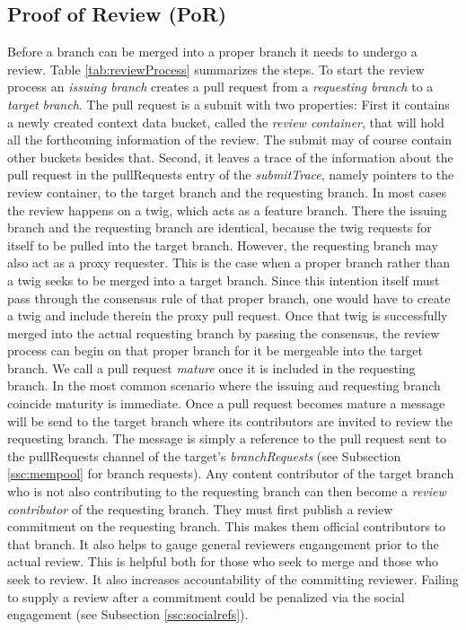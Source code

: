 \documentclass[14pt]{article}
\begin{document}
\subsection{Proof of Review (PoR)}
\label{ssc:por}

Before a branch can be merged into a proper branch it needs to undergo a review. Table \ref{tab:reviewProcess} summarizes the steps.
To start the review process an \textit{issuing branch} creates a pull request from a \textit{requesting branch} to a \textit{target branch}. The pull request is a submit with two properties: First it contains a newly created context data bucket, called the \textit{review container}, that will hold all the forthcoming information of the review. The submit may of course contain other buckets besides that. Second, it leaves a trace of the information about the pull request in the pullRequests entry of the \textit{submitTrace}, namely pointers to the review container, to the target branch and the requesting branch. In most cases the review happens on a twig, which acts as a feature branch. There the issuing branch and the requesting branch are identical, because the twig requests for itself to be pulled into the target branch. However, the requesting branch may also act as a proxy requester. This is the case when a proper branch rather than a twig seeks to be merged into a target branch. Since this intention itself must pass through the consensus rule of that proper branch, one would have to create a twig and include therein the proxy pull request. Once that twig is successfully merged into the actual requesting branch by passing the consensus, the review process can begin on that proper branch for it be mergeable into the target branch. We call a pull request \textit{mature} once it is included in the requesting branch. In the most common scenario where the issuing and requesting branch coincide maturity is immediate. 
Once a pull request becomes mature a message will be send to the target branch  where its contributors are invited to review the requesting branch. The message is simply a reference to the pull request sent to the pullRequests channel of the target's \textit{branchRequests} (see Subsection \ref{ssc:mempool} for branch requests).
Any content contributor of the target branch who is not also contributing to the requesting branch can then become a \textit{review contributor} of the requesting branch. They must first publish a review commitment on the requesting branch. This makes them official contributors to that branch. It also helps to gauge general reviewers engangement prior to the actual review. This is helpful both for those who seek to merge and those who seek to review. It also increases accountability of the committing reviewer. Failing to supply a review after a commitment could be penalized via the social engagement (see Subsection \ref{ssc:socialrefs}).  
\end{document}

